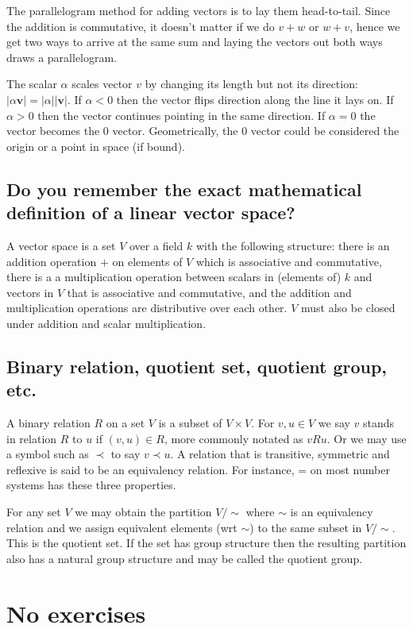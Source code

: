 \documentclass{article}
\begin{document}
The parallelogram method for adding vectors is to lay them head-to-tail. Since the addition is commutative, it doesn't matter if we do $v+w$ or $w+v$, hence we get two ways to arrive at the same sum and laying the vectors out both ways draws a parallelogram.

The scalar $\alpha$ scales vector $v$ by changing its length but not its direction: $|\alpha \mathbf{v}| = |\alpha| |\mathbf{v}|$. If $\alpha < 0$ then the vector flips direction along the line it lays on. If $\alpha > 0$ then the vector continues pointing in the same direction. If $\alpha = 0$ the vector becomes the 0 vector. Geometrically, the 0 vector could be considered the origin or a point in space (if bound).

\subsection{Do you remember the exact mathematical definition of a linear
vector space?}

A vector space is a set $V$ over a field $k$ with the following structure: there is an addition operation $+$ on elements of $V$ which is associative and commutative, there is a a multiplication operation between scalars in (elements of) $k$ and vectors in $V$ that is associative and commutative, and the addition and multiplication operations are distributive over each other. $V$ must also be closed under addition and scalar multiplication. 

\subsection{Binary relation, quotient set, quotient group, etc.} A binary relation $R$ on a set $V$ is a subset of $V \times V$. For $v, u \in V$ we say $v$ stands in relation $R$ to $u$ if $(v,u) \in R$, more commonly notated as $vRu$. Or we may use a symbol such as $\prec$ to say $v \prec u$. A relation that is transitive, symmetric and reflexive is said to be an equivalency relation. For instance, = on most number systems has these three properties. 

For any set $V$ we may obtain the partition $V / \sim$ where $\sim$ is an equivalency relation and we assign equivalent elements (wrt $\sim$) to the same subset in $V / \sim$. This is the quotient set. If the set has group structure then the resulting partition also has a natural group structure and may be called the quotient group.

\section{No exercises}
\end{document}
